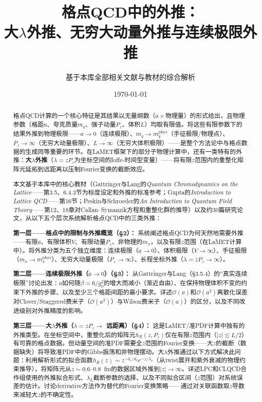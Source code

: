 \documentclass[12pt,a4paper]{ctexart}
\title{\heiti 格点QCD中的外推：\\
大$\lambda$外推、无穷大动量外推与连续极限外推}
\author{基于本库全部相关文献与教材的综合解析}
\date{\today}
\theoremstyle{definition}
\begin{document}
\maketitle

\begin{abstract}
\noindent
格点QCD计算的一个核心特征是其结果以无量纲数（$a \times$物理量）的形式给出，且物理参数（格距$a$、夸克质量$m_q$、强子动量$P_z$、体积$L$）均取有限值。将这些有限参数下的结果外推到物理极限——$a\to 0$（连续极限）、$m_q\to m_q^{\text{phys}}$（手征极限/物理点）、$P_z\to\infty$（无穷大动量极限）、$L\to\infty$（无穷大体积极限）——是整个方法论中与格点数据的生成同等重要的环节。在LaMET框架下的部分子物理计算中，还有一类特有的外推：\textbf{大$\lambda$外推}（$\lambda = zP_z$为坐标空间的Ioffe-时间型变量）——将有限$z$范围内的重整化矩阵元延拓到远距离以压制Fourier变换的截断效应。

本文基于本库中的核心教材（Gattringer与Lang的\textit{Quantum Chromodynamics on the Lattice}——第3.5、6.4.3节为标度设定和外推的标准参考；Gupta的\textit{Introduction to Lattice QCD}——第16节；Peskin与Schroeder的\textit{An Introduction to Quantum Field Theory}——第12、18章对Callan--Symanzik方程和重整化群的推导）以及约30篇研究论文，从以下五个层次系统解析格点QCD中的三类外推：

\textbf{第一层——格点中的限制与外推概览（§2）：}
系统阐述格点QCD为何天然地需要外推——有限$a$、有限体积$V$、有限动量$P_z$、非物理的$m_\pi$，以及有限$z$范围（在LaMET计算中）。将外推分类为五个独立维度：连续极限（$a\to 0$）、体积极限（$V\to\infty$）、手征极限（$m_\pi\to m_\pi^{\text{phys}}$）、无穷大动量极限（$P_z\to\infty$）、长程坐标外推（$\lambda = zP_z \to \infty$）。

\textbf{第二层——连续极限外推（$a\to 0$）（§3）：}
从Gattringer与Lang（§3.5.4）的``真实连续极限''讨论出发：$a$如何随$\beta = 6/g_0^2$的增大而减小（渐近自由）、在保持物理体积不变的约束下外推的步骤、以及至少三个格距间距的最小要求。详述$\mathcal{O}(a)$和$\mathcal{O}(a^2)$离散化误差对Clover/Staggered费米子（$\mathcal{O}(a^2)$）与Wilson费米子（$\mathcal{O}(a)$）的区分，以及不同改进级别对外推精度的影响。

\textbf{第三层——大$\lambda$外推（$\lambda = zP_z \to$ 远距离）（§4）：}
这是LaMET/准PDF计算中独有的外推类型。在坐标空间中，重整化后的矩阵元$h_R(z,P_z)$仅在有限$z$范围内（$|z| \lesssim L/2$）有可靠的格点数据。但动量空间的准PDF需要全$z$范围的Fourier变换——大$z$的截断（数据缺失）将导致准PDF中的Gibbs振荡和非物理摆动。大$\lambda$外推通过以下方式解决此问题：利用解析形式的拟合函数$h_R(z) \sim z^{-d_1/d_2}e^{-z/\lambda_0}$（从twist展开和紫外衰减的物理约束推导），将矩阵元从$z\sim 0.6\text{--}0.8$~fm的数据区域外推到$|z| \to \infty$。详述LPC和CLQCD合作组使用的外推拟合形式、$\lambda_L$截断参数的选择、以及不同拟合区间（$z$范围）对系统误差的估计。讨论derivative方法作为替代的Fourier变换策略——通过对关联函数取$z$导数来减轻大$z$的不确定性。


\end{abstract}
\end{document}
